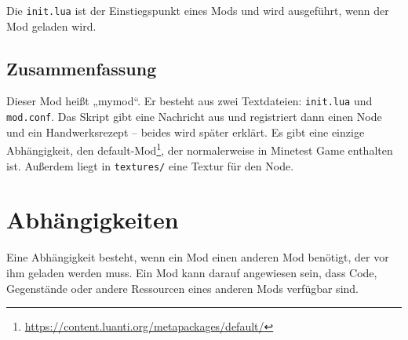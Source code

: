 \begin{Shaded}
\begin{Highlighting}[]
\OperatorTok{(}\OperatorTok{)}

\OperatorTok{(}\OperatorTok{,} \OperatorTok{\{}
     \OperatorTok{=} \OperatorTok{,}
     \OperatorTok{=} \OperatorTok{\{}  \OperatorTok{\},}
     \OperatorTok{=} \OperatorTok{\{}  \OperatorTok{=}  \OperatorTok{\},}
\OperatorTok{\})}

\OperatorTok{(\{}
     \OperatorTok{=} \OperatorTok{,}
     \OperatorTok{=} \OperatorTok{,}
     \OperatorTok{=} \OperatorTok{\{} \OperatorTok{,}  \OperatorTok{\},}
\OperatorTok{\})}
\end{Highlighting}
\end{Shaded}

Die \texttt{init.\allowbreak{}lua} ist der Einstiegspunkt eines Mods und
wird ausgeführt, wenn der Mod geladen wird.

\subsection{Zusammenfassung}\label{zusammenfassung}

Dieser Mod heißt „mymod``. Er besteht aus zwei Textdateien:
\texttt{init.\allowbreak{}lua} und \texttt{mod.\allowbreak{}conf}. Das
Skript gibt eine Nachricht aus und registriert dann einen Node und ein
Handwerksrezept -- beides wird später erklärt. Es gibt eine einzige
Abhängigkeit, den default-Mod\footnote{\url{https://content.luanti.org/metapackages/default/}},
der normalerweise in Minetest Game enthalten ist. Außerdem liegt in
\texttt{textures/\allowbreak{}} eine Textur für den Node.

\section{Abhängigkeiten}\label{abhuxe4ngigkeiten}

Eine Abhängigkeit besteht, wenn ein Mod einen anderen Mod benötigt, der
vor ihm geladen werden muss. Ein Mod kann darauf angewiesen sein, dass
Code, Gegenstände oder andere Ressourcen eines anderen Mods verfügbar
sind.

